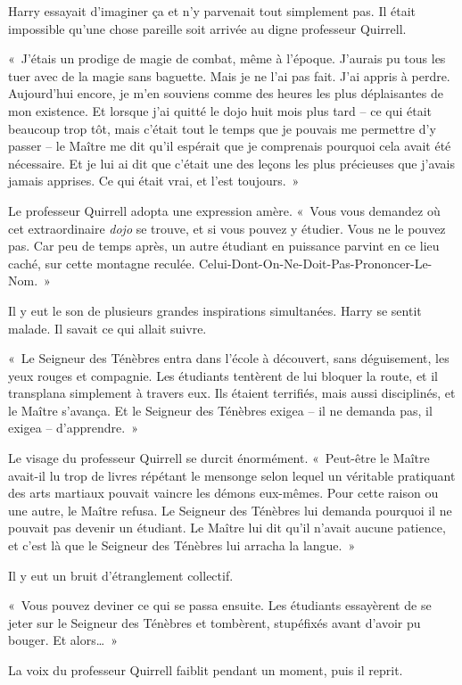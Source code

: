 Harry essayait d'imaginer ça et n'y parvenait tout simplement pas. Il était impossible qu'une chose pareille soit arrivée au digne professeur Quirrell.

«~J'étais un prodige de magie de combat, même à l'époque. J'aurais pu tous les tuer avec de la magie sans baguette. Mais je ne l'ai pas fait. J'ai appris à perdre. Aujourd'hui encore, je m'en souviens comme des heures les plus déplaisantes de mon existence. Et lorsque j'ai quitté le dojo huit mois plus tard -- ce qui était beaucoup trop tôt, mais c'était tout le temps que je pouvais me permettre d'y passer -- le Maître me dit qu'il espérait que je comprenais pourquoi cela avait été nécessaire. Et je lui ai dit que c'était une des leçons les plus précieuses que j'avais jamais apprises. Ce qui était vrai, et l'est toujours.~»

Le professeur Quirrell adopta une expression amère. «~Vous vous demandez où cet extraordinaire \emph{dojo} se trouve, et si vous pouvez y étudier. Vous ne le pouvez pas. Car peu de temps après, un autre étudiant en puissance parvint en ce lieu caché, sur cette montagne reculée. Celui-Dont-On-Ne-Doit-Pas-Prononcer-Le-Nom.~»

Il y eut le son de plusieurs grandes inspirations simultanées. Harry se sentit malade. Il savait ce qui allait suivre.

«~Le Seigneur des Ténèbres entra dans l'école à découvert, sans déguisement, les yeux rouges et compagnie. Les étudiants tentèrent de lui bloquer la route, et il transplana simplement à travers eux. Ils étaient terrifiés, mais aussi disciplinés, et le Maître s'avança. Et le Seigneur des Ténèbres exigea -- il ne demanda pas, il exigea -- d'apprendre.~»

Le visage du professeur Quirrell se durcit énormément. «~Peut-être le Maître avait-il lu trop de livres répétant le mensonge selon lequel un véritable pratiquant des arts martiaux pouvait vaincre les démons eux-mêmes. Pour cette raison ou une autre, le Maître refusa. Le Seigneur des Ténèbres lui demanda pourquoi il ne pouvait pas devenir un étudiant. Le Maître lui dit qu'il n'avait aucune patience, et c'est là que le Seigneur des Ténèbres lui arracha la langue.~»

Il y eut un bruit d'étranglement collectif.

«~Vous pouvez deviner ce qui se passa ensuite. Les étudiants essayèrent de se jeter sur le Seigneur des Ténèbres et tombèrent, stupéfixés avant d'avoir pu bouger. Et alors…~»

La voix du professeur Quirrell faiblit pendant un moment, puis il reprit.

